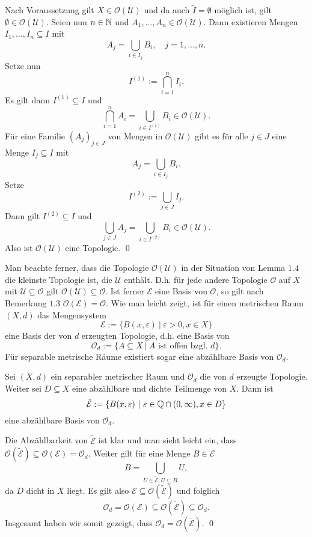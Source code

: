 \begin{proof*}
    Nach Voraussetzung gilt $X \in \mathcal{O}(\mathcal{U})$ und da auch $\tilde{I} = \emptyset$ möglich ist, gilt $\emptyset \in \mathcal{O}(\mathcal{U})$. 
    Seien nun $n \in \mathbb{N}$ und $A_1,...,A_n \in \mathcal{O}(\mathcal{U})$. Dann existieren Mengen $I_1,...,I_n \subseteq I$ mit 
    $$
        A_j = \bigcup_{i \in I_j}B_i, \quad j=1,...,n.
    $$ 
    Setze nun
    $$
        I^{(1)} := \bigcap_{i=1}^n I_i. 
    $$
    Es gilt dann $I^{(1)} \subseteq I$ und 
    $$
        \bigcap_{i=1}^n A_i = \bigcup_{i \in I^{(1)}}B_i \in \mathcal{O}(\mathcal{U}). 
    $$
    Für eine Familie $(A_j)_{j \in J}$ von Mengen in $\mathcal{O}(\mathcal{U})$ gibt es für alle $j \in J$ eine Menge $I_j \subseteq I$ mit 
    $$
        A_j = \bigcup_{i \in I_j} B_i. 
    $$
    Setze
    $$
        I^{(2)} := \bigcup_{j \in J}I_j. 
    $$
    Dann gilt $I^{(2)} \subseteq I$ und 
    $$
       \bigcup_{j \in J}A_j =  \bigcup_{i\in I^{(2)}}B_i \in \mathcal{O}(\mathcal{U}).
    $$
    Also ist $\mathcal{O}(\mathcal{U})$ eine Topologie. \qed 
\end{proof*}
Man beachte ferner, dass die Topologie $\mathcal{O}(\mathcal{U})$ in der Situation von Lemma $1.4$ die kleinste Topologie ist, die $\mathcal{U}$ enthält. 
D.h. für jede andere Topologie $\mathcal{O}$ auf $X$ mit $\mathcal{U} \subseteq \mathcal{O}$ gilt $\mathcal{O}(\mathcal{U}) \subseteq \mathcal{O}$. 
Ist ferner $\mathcal{E}$ eine Basis von $\mathcal{O}$, so gilt nach Bemerkung $1.3$ $\mathcal{O}(\mathcal{E}) = \mathcal{O}$. 
\newline 
Wie man leicht zeigt, ist für einen metrischen Raum $(X,d)$ das Mengensystem 
$$
    \mathcal{E} := \{B(x, \varepsilon) \ | \ \varepsilon > 0, x \in X \}
$$
eine Basis der von $d$ erzeugten Topologie, d.h. eine Basis von 
$$
    \mathcal{O}_d := \{A \subseteq X \ | \ A \text{ ist offen bzgl. } d\}. 
$$
Für separable metrische Räume existiert sogar eine abzählbare Basis von $\mathcal{O}_d$. 

\begin{lemma}
    Sei $(X,d)$ ein separabler metrischer Raum und $\mathcal{O}_d$ die von $d$ erzeugte Topologie. Weiter sei $D \subseteq X$ eine abzählbare und dichte Teilmenge von $X$. Dann ist 
    $$
        \tilde{\mathcal{E}} := \{B(x, \varepsilon) \ | \ \varepsilon \in \mathbb{Q} \cap (0,\infty), x \in D\}
    $$
    eine abzählbare Basis von $\mathcal{O}_d$. 
\end{lemma}

\begin{proof*}
    Die Abzählbarkeit von $\tilde{\mathcal{E}}$ ist klar und man sieht leicht ein, dass $\mathcal{O}(\tilde{\mathcal{E}}) \subseteq \mathcal{O}(\mathcal{E}) = \mathcal{O}_d$. Weiter gilt für eine Menge $B \in \mathcal{E}$
    $$
        B = \bigcup_{U \in \tilde{\mathcal{E}}, U \subseteq B}U,
    $$ 
    da $D$ dicht in $X$ liegt. Es gilt also $\mathcal{E} \subseteq \mathcal{O}({\tilde{\mathcal{E}}})$ und folglich
    $$
        \mathcal{O}_d = \mathcal{O}(\mathcal{E}) \subseteq \mathcal{O}({\tilde{\mathcal{E}}}) \subseteq \mathcal{O}_d. 
    $$
    Insgesamt haben wir somit gezeigt, dass $\mathcal{O}_d = \mathcal{O}(\tilde{\mathcal{E}})$. \qed
\end{proof*}    

